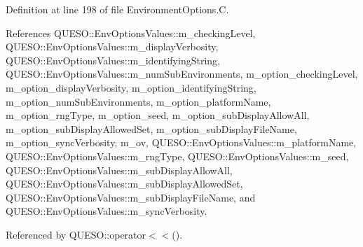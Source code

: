 Definition at line 198 of file Environment\-Options.\-C.



References Q\-U\-E\-S\-O\-::\-Env\-Options\-Values\-::m\-\_\-checking\-Level, Q\-U\-E\-S\-O\-::\-Env\-Options\-Values\-::m\-\_\-display\-Verbosity, Q\-U\-E\-S\-O\-::\-Env\-Options\-Values\-::m\-\_\-identifying\-String, Q\-U\-E\-S\-O\-::\-Env\-Options\-Values\-::m\-\_\-num\-Sub\-Environments, m\-\_\-option\-\_\-checking\-Level, m\-\_\-option\-\_\-display\-Verbosity, m\-\_\-option\-\_\-identifying\-String, m\-\_\-option\-\_\-num\-Sub\-Environments, m\-\_\-option\-\_\-platform\-Name, m\-\_\-option\-\_\-rng\-Type, m\-\_\-option\-\_\-seed, m\-\_\-option\-\_\-sub\-Display\-Allow\-All, m\-\_\-option\-\_\-sub\-Display\-Allowed\-Set, m\-\_\-option\-\_\-sub\-Display\-File\-Name, m\-\_\-option\-\_\-sync\-Verbosity, m\-\_\-ov, Q\-U\-E\-S\-O\-::\-Env\-Options\-Values\-::m\-\_\-platform\-Name, Q\-U\-E\-S\-O\-::\-Env\-Options\-Values\-::m\-\_\-rng\-Type, Q\-U\-E\-S\-O\-::\-Env\-Options\-Values\-::m\-\_\-seed, Q\-U\-E\-S\-O\-::\-Env\-Options\-Values\-::m\-\_\-sub\-Display\-Allow\-All, Q\-U\-E\-S\-O\-::\-Env\-Options\-Values\-::m\-\_\-sub\-Display\-Allowed\-Set, Q\-U\-E\-S\-O\-::\-Env\-Options\-Values\-::m\-\_\-sub\-Display\-File\-Name, and Q\-U\-E\-S\-O\-::\-Env\-Options\-Values\-::m\-\_\-sync\-Verbosity.



Referenced by Q\-U\-E\-S\-O\-::operator$<$$<$().


